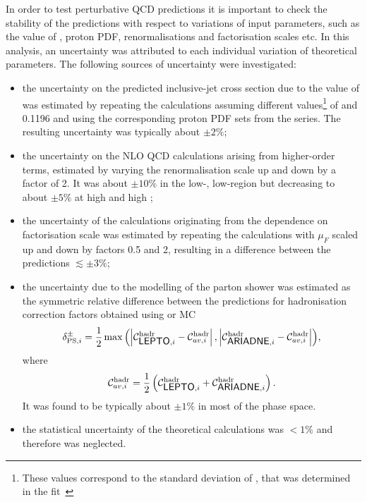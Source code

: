 In order to test perturbative QCD predictions it is important to check the stability of the predictions with respect to variations of input parameters, such as the value of \as, proton PDF, renormalisations and factorisation scales etc. In this analysis, an uncertainty was attributed to each individual variation of theoretical parameters. The following sources of uncertainty were investigated:
\begin{itemize}
 \item the uncertainty on the predicted inclusive-jet cross section due to the value of \asz was estimated by repeating the calculations assuming different values\footnote{These values correspond to the standard deviation of \as, that was determined in the \herapdf fit~\cite{upub:herapdf1.5}} of  and 0.1196 and using the corresponding proton PDF sets from the  series. The resulting uncertainty was typically about $\pm2\%$;
 \item the uncertainty on the NLO QCD calculations arising from higher-order terms, estimated by varying the renormalisation scale up and down by a factor of 2. It was about $\pm10\%$ in the low-\qsq, low-\etjetb region but decreasing to about $\pm5\%$ at high \qsq and high \etjetb;
 \item the uncertainty of the calculations originating from the dependence on factorisation scale was estimated by repeating the calculations with $\mu_F$ scaled up and down by factors 0.5 and 2, resulting in a difference between the predictions $\lesssim\pm 3\%$;
 \item the uncertainty due to the modelling of the parton shower was estimated as the symmetric relative difference between the predictions for hadronisation correction factors obtained using \lepto or \ariadne MC
\begin{equation}
\delta^{\pm}_{\text{PS},i} = \frac{1}{2}\max{\left(\left|\mathcal{C}^\text{hadr}_{\mbox{\textsf{LEPTO}},i} - \mathcal{C}^\text{hadr}_{av,i}\right|,\left|\mathcal{C}^\text{hadr}_{\mbox{\textsf{ARIADNE}},i} - \mathcal{C}^\text{hadr}_{av,i}\right|\right)},
\label{eq:hadrcorunc}
\end{equation}
where
\begin{equation}
\mathcal{C}^\text{hadr}_{av,i} = \frac{1}{2}\left(\mathcal{C}^\text{hadr}_{\mbox{\textsf{LEPTO}},i}+\mathcal{C}^\text{hadr}_{\mbox{\textsf{ARIADNE}},i}\right).\notag
\end{equation}
 It was found to be typically about $\pm 1\%$ in most of the phase space.
\item the statistical uncertainty of the theoretical calculations was $<1\%$ and therefore was neglected.

\end{itemize}

